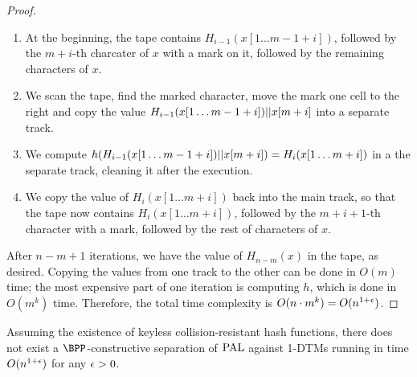 \begin{proof}
\begin{enumerate}
    \item At the beginning, the tape contains $H_{i-1}(x[1 \ldots m-1+i])$, followed by the $m+i$-th 
    charcater of $x$ with a mark on it, followed by the remaining characters of $x$.
    \item We scan the tape, find the marked character, move the mark one cell to the right and copy the value 
    $H_{i-1}(x[1 \ldots m-1+i]) || x[m+i]$ into a separate track. 
    \item We compute $h(H_{i-1}(x[1 \ldots m-1+i]) || x[m+i]) = H_i(x[1 \ldots m+i])$ in a the separate
    track, cleaning it after the execution.
    \item We copy the value of $H_i(x[1 \ldots m+i])$ back into the main track, so that the tape now contains
    $H_{i}(x[1 \ldots m+i])$, followed by the $m+i+1$-th character with a mark, followed by the rest of characters
    of $x$.
\end{enumerate}

After $n-m+1$ iterations, we have the value of $H_{n-m}(x)$ in the tape, as desired. Copying the values from one
track to the other can be done in $O(m)$ time; the most expensive part of one iteration is computing $h$, which 
is done in $O(m^k)$ time. Therefore, the total time complexity is $O(n \cdot m^k) = O(n^{1+\epsilon})$. 



\end{proof}


\begin{theorem}
    \label{thm:nobppseparation}
    Assuming the existence of keyless collision-resistant hash functions, there does not exist a 
    $\BPP$-constructive separation of $\mathrm{PAL}$ against 1-DTMs running in time $O(n^{1+\epsilon})$ for any $\epsilon > 0$.
\end{theorem}

